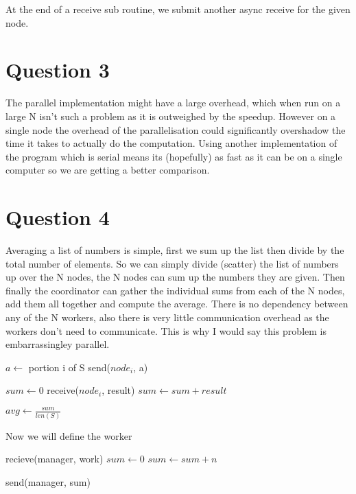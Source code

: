 \documentclass[a4paper, 12pt]{article}
\begin{document}
		At the end of a receive sub routine, we submit another async receive for the given node.
  	
  	\section{Question 3}
		The parallel implementation might have a large overhead, which when run on a large N isn't such a problem as it is outweighed by the speedup. However on a single node the overhead of the parallelisation could significantly overshadow the time it takes to actually do the computation. Using another implementation of the program which is serial means its (hopefully) as fast as it can be on a single computer so we are getting a better comparison.
  	
  	
  	\section{Question 4}
		Averaging a list of numbers is simple, first we sum up the list then divide by the total number of elements. So we can simply divide (scatter) the list of numbers up over the N nodes, the N nodes can sum up the numbers they are given. Then finally the coordinator can gather the individual sums from each of the N nodes, add them all together and compute the average. There is no dependency between any of the N workers, also there is very little communication overhead as the workers don't need to communicate. This is why I would say this problem is embarrassingley parallel.\\		
		
		\begin{algorithm}[H]
			\begin{algorithmic}[1]
						\State $a \gets $ portion i of S
						\State send($node_i$, a)
					\EndFor
					
					\State $sum \gets 0$
						\State receive($node_i$, result)
						\State $sum \gets sum + result$
					\EndFor
					
					\State $avg \gets \frac{sum}{len(S)}$
				\EndProcedure
			\end{algorithmic}
		\end{algorithm}
  	
  		Now we will define the worker
  		
  		\begin{algorithm}[H]
			\begin{algorithmic}[1]
					\State recieve(manager, work)
					\State $sum \gets 0$
						\State $sum \gets sum + n$
					\EndFor
					
					\State send(manager, sum)
				\EndProcedure
			\end{algorithmic}
		\end{algorithm}
\end{document}

